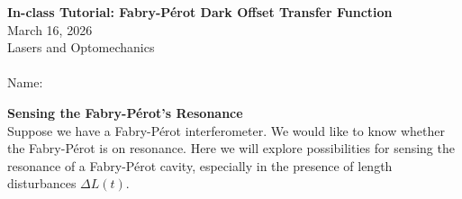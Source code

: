 \documentclass[11pt]{article}
\begin{document}
\begin{center}
    \textbf{In-class Tutorial: Fabry-P\'erot Dark Offset Transfer Function}\\
    March 16, 2026\\
    Lasers and Optomechanics\\~\\
    Name: \underline{\hspace{10cm}}
\end{center}


\vspace{0.2cm}



\noindent
\textbf{Sensing the Fabry-P\'erot's Resonance}\\
Suppose we have a Fabry-P\'erot interferometer.
We would like to know whether the Fabry-P\'erot is on resonance.
Here we will explore possibilities for sensing the resonance of a Fabry-P\'erot cavity,
especially in the presence of length disturbances $\Delta L(t)$.
\end{document}

